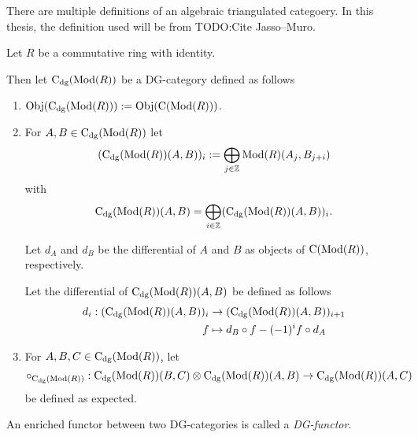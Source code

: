 There are multiple definitions of an algebraic triangulated categoery. In this thesis, the definition used will be from TODO:Cite Jasso--Muro.

\begin{definition}[\( \C_{\dg}(\Mod(R)) \)]
    Let \( R \) be a commutative ring with identity.

    Then let \emph{\( \C_{\dg}(\Mod(R)) \)} be a DG-category defined as follows
    \begin{enumerate}
        \item {
            \( \operatorname{Obj}(\operatorname{C}_{\operatorname{dg}}(\operatorname{Mod}(R))) := \operatorname{Obj}(\operatorname{C}(\operatorname{Mod}(R))) \).
        }
        \item {
            For \( A, B \in \operatorname{C}_{\operatorname{dg}}(\operatorname{Mod}(R)) \) let
            \[ 
                (\operatorname{C}_{\operatorname{dg}}(\operatorname{Mod}(R))(A, B))_i := \bigoplus_{j \in {\mathbb{Z}}} \operatorname{Mod}(R)(A_j, B_{j + i})
            \]
            with
            \[
                \operatorname{C}_{\operatorname{dg}}(\operatorname{Mod}(R))(A, B) = \bigoplus_{i \in {\mathbb{Z}}} (\operatorname{C}_{\operatorname{dg}}(\operatorname{Mod}(R))(A, B))_i.
            \]

            Let \( d_A \) and \( d_B \) be the differential of \( A \) and \( B \) as objects of \( \operatorname{C}(\operatorname{Mod}(R)) \), respectively.

            Let the differential of \( \operatorname{C}_{\operatorname{dg}}(\operatorname{Mod}(R))(A, B) \) be defined as follows
            \begin{align*}
                d_i: (\operatorname{C}_{\operatorname{dg}}(\operatorname{Mod}(R))(A, B))_i &\to (\operatorname{C}_{\operatorname{dg}}(\operatorname{Mod}(R))(A, B))_{i + 1} \\
                f &\mapsto d_B \circ f - (-1)^i f \circ d_A
            \end{align*}
        }
        \item {
            For \( A, B, C \in \operatorname{C}_{\operatorname{dg}}(\operatorname{Mod}(R)) \), let
            \[
                \circ_{\operatorname{C}_{\operatorname{dg}}(\operatorname{Mod}(R))}: \operatorname{C}_{\operatorname{dg}}(\operatorname{Mod}(R))(B, C) \otimes \operatorname{C}_{\operatorname{dg}}(\operatorname{Mod}(R))(A, B) \to \operatorname{C}_{\operatorname{dg}}(\operatorname{Mod}(R))(A, C)
            \]
            be defined as expected.
        }
    \end{enumerate}
\end{definition}

\begin{definition}[DG-functor]
    An enriched functor between two DG-categories is called a \emph{DG-functor}.
\end{definition}

